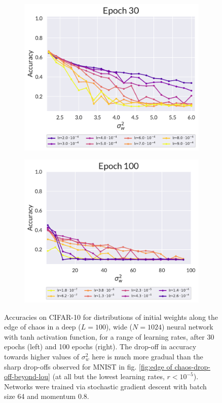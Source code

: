 \begin{figure}[!h]
	\centering
	\begin{subfigure}[t]{0.5\textwidth}
		\centering
		\includegraphics[width=\textwidth]{figures/chapter4/CIFAR-TANH-30Epoch.pdf}
	\end{subfigure}%
	\begin{subfigure}[t]{0.5\textwidth}
		\centering
		\includegraphics[width=\textwidth]{figures/chapter4/CIFAR-TANH-100Epoch.pdf}
	\end{subfigure}
	\caption{Accuracies on CIFAR-10 for distributions of initial weights along the edge of chaos in a deep ($L=100$), wide ($N=1024$) neural network with tanh activation function, for a range of learning rates, after 30 epochs (left) and 100 epochs (right). The drop-off in accuracy towards higher values of $\sigma_{w}^{2}$ here is much more gradual than the sharp drop-offs observed for MNIST in fig. \ref{fig:edge of chaos-drop-off-beyond-lou} (at all but the lowest learning rates, $r < 10^{-5}$). Networks were trained via stochastic gradient descent with batch size 64 and momentum 0.8.} %
	\label{fig:EOCdropoffCIFARtanh}
\end{figure}

